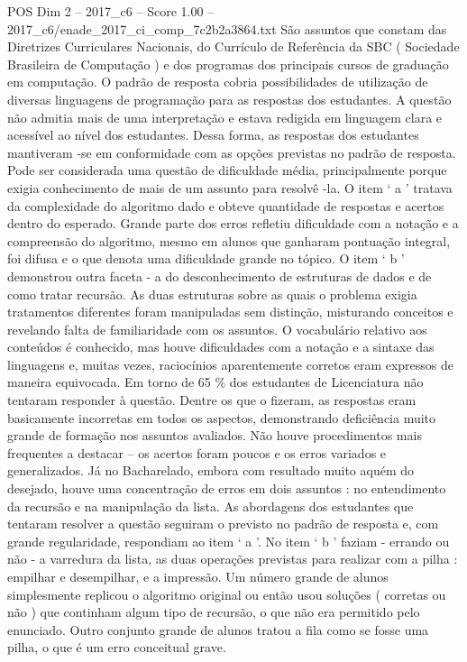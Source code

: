 \begin{textsample}{POS Dim 2 – 2017\_c6 – Score 1.00 – 2017\_c6/enade\_2017\_ci\_comp\_7c2b2a3864.txt}
São assuntos que constam das Diretrizes Curriculares Nacionais, do Currículo de Referência da SBC ( Sociedade Brasileira de Computação ) e dos programas dos principais cursos de graduação em computação.
O padrão de resposta cobria possibilidades de utilização de diversas linguagens de programação para as respostas dos estudantes.
A questão não admitia mais de uma interpretação e estava redigida em linguagem clara e acessível ao nível dos estudantes.
Dessa forma, as respostas dos estudantes mantiveram -se em conformidade com as opções previstas no padrão de resposta.
Pode ser considerada uma questão de dificuldade média, principalmente porque exigia conhecimento de mais de um assunto para resolvê -la.
O item ‘ a ’ tratava da complexidade do algoritmo dado e obteve quantidade de respostas e acertos dentro do esperado.
Grande parte dos erros refletiu dificuldade com a notação e a compreensão do algoritmo, mesmo em alunos que ganharam pontuação integral, foi difusa e o que denota uma dificuldade grande no tópico.
O item ‘ b ’ demonstrou outra faceta - a do desconhecimento de estruturas de dados e de como tratar recursão.
As duas estruturas sobre as quais o problema exigia tratamentos diferentes foram manipuladas sem distinção, misturando conceitos e revelando falta de familiaridade com os assuntos.
O vocabulário relativo aos conteúdos é conhecido, mas houve dificuldades com a notação e a sintaxe das linguagens e, muitas vezes, raciocínios aparentemente corretos eram expressos de maneira equivocada.
Em torno de 65 \% dos estudantes de Licenciatura não tentaram responder à questão.
Dentre os que o fizeram, as respostas eram basicamente incorretas em todos os aspectos, demonstrando deficiência muito grande de formação nos assuntos avaliados.
Não houve procedimentos mais frequentes a destacar – os acertos foram poucos e os erros variados e generalizados.
Já no Bacharelado, embora com resultado muito aquém do desejado, houve uma concentração de erros em dois assuntos : no entendimento da recursão e na manipulação da lista.
As abordagens dos estudantes que tentaram resolver a questão seguiram o previsto no padrão de resposta e, com grande regularidade, respondiam ao item ‘ a ’.
No item ‘ b ’ faziam - errando ou não - a varredura da lista, as duas operações previstas para realizar com a pilha : empilhar e desempilhar, e a impressão.
Um número grande de alunos simplesmente replicou o algoritmo original ou então usou soluções ( corretas ou não ) que continham algum tipo de recursão, o que não era permitido pelo enunciado.
Outro conjunto grande de alunos tratou a fila como se fosse uma pilha, o que é um erro conceitual grave.

\end{textsample}
